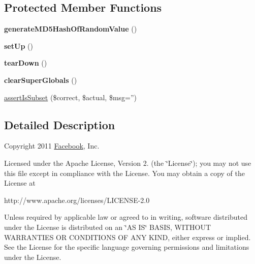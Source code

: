 \subsection*{Protected Member Functions}
\begin{DoxyCompactItemize}
\item 
\hypertarget{class_p_h_p_s_d_k_test_case_a082d591a1bfea4aaeda1b1dfbf464e62}{{\bfseries generate\-M\-D5\-Hash\-Of\-Random\-Value} ()}\label{class_p_h_p_s_d_k_test_case_a082d591a1bfea4aaeda1b1dfbf464e62}

\item 
\hypertarget{class_p_h_p_s_d_k_test_case_a0bc688732d2b3b162ffebaf7812e78da}{{\bfseries set\-Up} ()}\label{class_p_h_p_s_d_k_test_case_a0bc688732d2b3b162ffebaf7812e78da}

\item 
\hypertarget{class_p_h_p_s_d_k_test_case_a80fe3d17e658907fc75346a0ec9d6fc7}{{\bfseries tear\-Down} ()}\label{class_p_h_p_s_d_k_test_case_a80fe3d17e658907fc75346a0ec9d6fc7}

\item 
\hypertarget{class_p_h_p_s_d_k_test_case_a0331132cd0badeb6a4077b0304bc0f1e}{{\bfseries clear\-Super\-Globals} ()}\label{class_p_h_p_s_d_k_test_case_a0331132cd0badeb6a4077b0304bc0f1e}

\item 
\hyperlink{class_p_h_p_s_d_k_test_case_a4971a32cd91c5fc5c3c7963574f3ac8b}{assert\-Is\-Subset} (\$correct, \$actual, \$msg='')
\end{DoxyCompactItemize}


\subsection{Detailed Description}
Copyright 2011 \hyperlink{class_facebook}{Facebook}, Inc.

Licensed under the Apache License, Version 2. (the \char`\"{}\-License\char`\"{}); you may not use this file except in compliance with the License. You may obtain a copy of the License at \begin{DoxyVerb}http://www.apache.org/licenses/LICENSE-2.0
\end{DoxyVerb}


Unless required by applicable law or agreed to in writing, software distributed under the License is distributed on an \char`\"{}\-A\-S I\-S\char`\"{} B\-A\-S\-I\-S, W\-I\-T\-H\-O\-U\-T W\-A\-R\-R\-A\-N\-T\-I\-E\-S O\-R C\-O\-N\-D\-I\-T\-I\-O\-N\-S O\-F A\-N\-Y K\-I\-N\-D, either express or implied. See the License for the specific language governing permissions and limitations under the License. 

